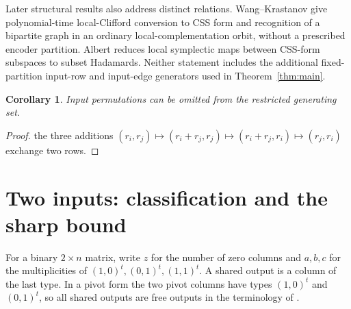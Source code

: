 \documentclass[11pt]{article}
\newtheorem{corollary}[theorem]{Corollary}
\begin{document}
Later structural results also address distinct relations.
Wang--Krastanov \cite[Theorem 1 and Corollary 5]{WK} give polynomial-time
local-Clifford conversion to CSS form and recognition of a bipartite
graph in an ordinary local-complementation orbit, without a prescribed
encoder partition. Albert \cite[Appendix F.2, Lemma F.2]{Albert} reduces
local symplectic maps between CSS-form subspaces to subset Hadamards.
Neither statement includes the additional fixed-partition input-row
and input-edge generators used in Theorem~\ref{thm:main}.

\begin{corollary}
Input permutations can be omitted from the restricted generating set.
\end{corollary}
\begin{proof}
the three additions $(r_i,r_j)\mapsto(r_i+r_j,r_j)
\mapsto(r_i+r_j,r_i)\mapsto(r_j,r_i)$ exchange two rows.
\end{proof}

\section{Two inputs: classification and the sharp bound}
For a binary $2\times n$ matrix, write $z$ for the number of zero columns
and $a,b,c$ for the multiplicities of $(1,0)^t,(0,1)^t,(1,1)^t$.
A shared output is a column of the last type. In a pivot form the two
pivot columns have types $(1,0)^t$ and $(0,1)^t$, so all shared outputs
are free outputs in the terminology of \cite[Section 8]{KL}.
\end{document}
